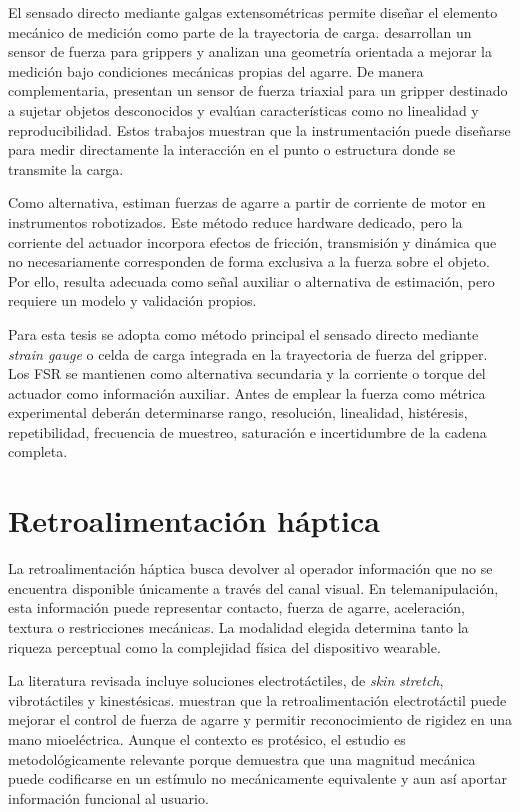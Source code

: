 El sensado directo mediante galgas extensométricas permite diseñar el elemento mecánico de medición como parte de la trayectoria de carga. \textcite{kuang2018force} desarrollan un sensor de fuerza para grippers y analizan una geometría orientada a mejorar la medición bajo condiciones mecánicas propias del agarre. De manera complementaria, \textcite{kim2022threeaxis} presentan un sensor de fuerza triaxial para un gripper destinado a sujetar objetos desconocidos y evalúan características como no linealidad y reproducibilidad. Estos trabajos muestran que la instrumentación puede diseñarse para medir directamente la interacción en el punto o estructura donde se transmite la carga.

Como alternativa, \textcite{schafer2022motorcurrent} estiman fuerzas de agarre a partir de corriente de motor en instrumentos robotizados. Este método reduce hardware dedicado, pero la corriente del actuador incorpora efectos de fricción, transmisión y dinámica que no necesariamente corresponden de forma exclusiva a la fuerza sobre el objeto. Por ello, resulta adecuada como señal auxiliar o alternativa de estimación, pero requiere un modelo y validación propios.

Para esta tesis se adopta como método principal el sensado directo mediante \textit{strain gauge} o celda de carga integrada en la trayectoria de fuerza del gripper. Los FSR se mantienen como alternativa secundaria y la corriente o torque del actuador como información auxiliar. Antes de emplear la fuerza como métrica experimental deberán determinarse rango, resolución, linealidad, histéresis, repetibilidad, frecuencia de muestreo, saturación e incertidumbre de la cadena completa.

\section{Retroalimentación háptica}

La retroalimentación háptica busca devolver al operador información que no se encuentra disponible únicamente a través del canal visual. En telemanipulación, esta información puede representar contacto, fuerza de agarre, aceleración, textura o restricciones mecánicas. La modalidad elegida determina tanto la riqueza perceptual como la complejidad física del dispositivo wearable.

La literatura revisada incluye soluciones electrotáctiles, de \textit{skin stretch}, vibrotáctiles y kinestésicas. \textcite{chai2022electrotactile} muestran que la retroalimentación electrotáctil puede mejorar el control de fuerza de agarre y permitir reconocimiento de rigidez en una mano mioeléctrica. Aunque el contexto es protésico, el estudio es metodológicamente relevante porque demuestra que una magnitud mecánica puede codificarse en un estímulo no mecánicamente equivalente y aun así aportar información funcional al usuario.


